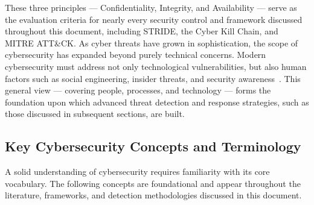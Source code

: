 These three principles --- Confidentiality, Integrity, and Availability --- serve as the evaluation criteria for nearly every security control and framework discussed throughout this document, including STRIDE, the Cyber Kill Chain, and MITRE ATT\&CK.
\clearpage
As cyber threats have grown in sophistication, the scope of cybersecurity has expanded beyond purely technical concerns. Modern cybersecurity must address not only technological vulnerabilities, but also human factors such as social engineering, insider threats, and security awareness~\cite{chandel2017social}. This general view --- covering people, processes, and technology --- forms the foundation upon which advanced threat detection and response strategies, such as those discussed in subsequent sections, are built.

\subsection{Key Cybersecurity Concepts and Terminology}
A solid understanding of cybersecurity requires familiarity with its core vocabulary. The following concepts are foundational and appear throughout the literature, frameworks, and detection methodologies discussed in this document.

